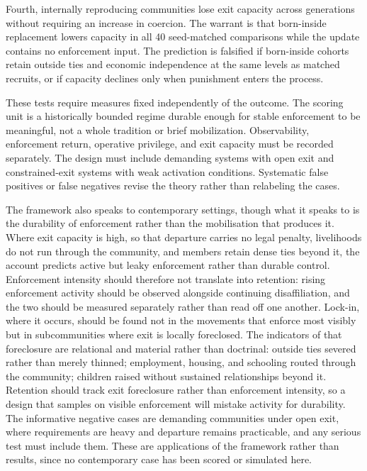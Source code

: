 \documentclass[12pt]{article}
\begin{document}
Fourth, internally reproducing communities lose exit capacity across generations without requiring an increase in
coercion. The warrant is that born-inside replacement lowers capacity in all 40 seed-matched comparisons while the
update contains no enforcement input. The prediction is falsified if born-inside cohorts retain outside ties and
economic independence at the same levels as matched recruits, or if capacity declines only when punishment enters the
process.

These tests require measures fixed independently of the outcome. The scoring unit is a historically bounded regime
durable enough for stable enforcement to be meaningful, not a whole tradition or brief mobilization. Observability,
enforcement return, operative privilege, and exit capacity must be recorded separately. The design must include
demanding systems with open exit and constrained-exit systems with weak activation conditions. Systematic false
positives or false negatives revise the theory rather than relabeling the cases.

The framework also speaks to contemporary settings, though what it speaks to is the durability of
enforcement rather than the mobilisation that produces it. Where exit capacity is high, so that
departure carries no legal penalty, livelihoods do not run through the community, and members retain
dense ties beyond it, the account predicts active but leaky enforcement rather than durable control.
Enforcement intensity should therefore not translate into retention: rising enforcement activity
should be observed alongside continuing disaffiliation, and the two should be measured separately
rather than read off one another. Lock-in, where it occurs, should be found not in the movements
that enforce most visibly but in subcommunities where exit is locally foreclosed. The indicators of
that foreclosure are relational and material rather than doctrinal: outside ties severed rather than
merely thinned; employment, housing, and schooling routed through the community; children raised
without sustained relationships beyond it. Retention should track exit foreclosure rather than
enforcement intensity, so a design that samples on visible enforcement will mistake activity for
durability. The informative negative cases are demanding communities under open exit, where
requirements are heavy and departure remains practicable, and any serious test must include them.
These are applications of the framework rather than results, since no contemporary case has been
scored or simulated here.
\end{document}
